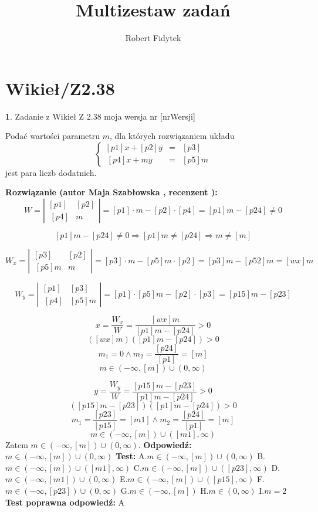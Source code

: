 \documentclass[12pt, a4paper]{article}
\title{Multizestaw zadań}
\author{Robert Fidytek}
\date{}
\theoremstyle{definition} %
\newtheorem{zad}{}
\newcommand{\kategoria}[1]{\section{#1}} %
\newcommand{\zadStart}[1]{\begin{zad}#1\newline} %
\newcommand{\zadStop}{\end{zad}}   %
\newcommand{\rozwStart}[2]{\noindent \textbf{Rozwiązanie (autor #1 , recenzent #2): }\newline} %
\newcommand{\rozwStop}{\newline}                                            %
\newcommand{\odpStart}{\noindent \textbf{Odpowiedź:}\newline}    %
\newcommand{\odpStop}{\newline}                                             %
\newcommand{\testStart}{\noindent \textbf{Test:}\newline} %
\newcommand{\testStop}{\newline} %
\newcommand{\kluczStart}{\noindent \textbf{Test poprawna odpowiedź:}\newline} %
\newcommand{\kluczStop}{\newline} %
\begin{document}
\maketitle


\kategoria{Wikieł/Z2.38}
\zadStart{Zadanie z Wikieł Z 2.38  moja wersja nr [nrWersji]}


Podać wartości parametru $m$, dla których rozwiązaniem układu
$$\left\{\begin{array}{rcl}
[p1]x+[p2]y&=&[p3]\\
\ [p4]x+my&=&[p5]m
\end{array} \right.$$
jest para liczb dodatnich.
\zadStop
\rozwStart{Maja Szabłowska}{}
$$W=\left| \begin{array}{lccr} [p1] & [p2]  \\ \ [p4] & m \end{array}\right| = [p1]\cdot m - [p2]\cdot [p4]=[p1]m-[p24] \neq 0$$

$$[p1]m-[p24] \neq 0 \Rightarrow [p1]m\neq [p24] \Rightarrow m\neq [m]$$

$$W_{x}=\left| \begin{array}{lccr} [p3] & [p2] \\ \ [p5]m & m \end{array}\right| = [p3]\cdot m - [p5]m\cdot [p2]=[p3]m-[p52]m=[wx]m$$

$$W_{y}=\left| \begin{array}{lccr} [p1] & [p3]  \\ \ [p4] & [p5]m \end{array}\right| = [p1]\cdot[p5]m - [p2]\cdot[p3]=[p15]m-[p23]$$

$$x=\frac{W_{x}}{W}=\frac{[wx]m}{[p1]m-[p24]}>0$$
$$([wx]m)([p1]m-[p24])>0$$ 
$$m_{1}=0 \land m_{2}=\frac{[p24]}{[p1]}=[m] $$
$$m\in(-\infty,[m])\cup(0,\infty)$$

$$y=\frac{W_{y}}{W}=\frac{[p15]m-[p23]}{[p1]m-[p24]}>0$$
$$([p15]m-[p23])([p1]m-[p24])>0$$ 
$$m_{1}=\frac{[p23]}{[p15]}=[m1] \land m_{2}=\frac{[p24]}{[p1]}=[m] $$
$$m\in(-\infty,[m])\cup([m1],\infty)$$
Zatem $m\in(-\infty,[m])\cup(0,\infty).$
\rozwStop
\odpStart
$m\in(-\infty,[m])\cup(0,\infty)$
\odpStop
\testStart
A.$m\in(-\infty,[m])\cup(0,\infty)$
B.$m\in(-\infty,[m])\cup([m1],\infty)$
C.$m\in(-\infty,[m])\cup([p23],\infty)$
D.$m\in(-\infty,[m1])\cup(0,\infty)$
E.$m\in(-\infty,[m])\cup([p15],\infty)$
F.$m\in(-\infty,[p23])\cup(0,\infty)$
G.$m\in(-\infty,[m])$
H.$m\in(0,\infty)$
I.$m=2$
\testStop
\kluczStart
A
\kluczStop
\end{document}
